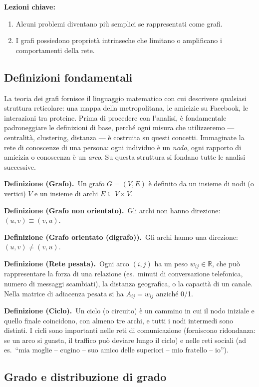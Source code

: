 \documentclass[12pt,a4paper]{article}
\newcommand{\definition}[2]{%
  \vspace{4pt}%
  \noindent\textbf{Definizione (#1).}\ #2\par\vspace{4pt}%
}
\begin{document}
\medskip
\noindent\textbf{Lezioni chiave:}
\begin{enumerate}
  \item Alcuni problemi diventano più semplici se rappresentati come grafi.
  \item I grafi possiedono proprietà intrinseche che limitano o amplificano i comportamenti
        della rete.
\end{enumerate}

\subsection{Definizioni fondamentali}

La teoria dei grafi fornisce il linguaggio matematico con cui descrivere qualsiasi struttura
reticolare: una mappa della metropolitana, le amicizie su Facebook, le interazioni tra proteine.
Prima di procedere con l'analisi, è fondamentale padroneggiare le definizioni di base, perché
ogni misura che utilizzeremo — centralità, clustering, distanza — è costruita su questi concetti.
Immaginate la rete di conoscenze di una persona: ogni individuo è un \emph{nodo}, ogni rapporto
di amicizia o conoscenza è un \emph{arco}. Su questa struttura si fondano tutte le analisi
successive.

\definition{Grafo}{Un grafo $G=(V,E)$ è definito da un insieme di nodi (o vertici) $V$ e
un insieme di archi $E \subseteq V \times V$.}

\definition{Grafo non orientato}{Gli archi non hanno direzione: $(u,v) \equiv (v,u)$.}

\definition{Grafo orientato (digrafo)}{Gli archi hanno una direzione: $(u,v) \neq (v,u)$.}

\definition{Rete pesata}{Ogni arco $(i,j)$ ha un peso $w_{ij} \in \mathbb{R}$, che
può rappresentare la forza di una relazione (es.\ minuti di conversazione telefonica,
numero di messaggi scambiati), la distanza geografica, o la capacità di un canale.
Nella matrice di adiacenza pesata si ha $A_{ij} = w_{ij}$ anziché 0/1.}

\definition{Ciclo}{Un ciclo (o circuito) è un cammino in cui il nodo iniziale e quello
finale coincidono, con almeno tre archi, e tutti i nodi intermedi sono distinti.
I cicli sono importanti nelle reti di comunicazione (forniscono ridondanza: se un
arco si guasta, il traffico può deviare lungo il ciclo) e nelle reti sociali (ad es.\
``mia moglie -- cugino -- suo amico delle superiori -- mio fratello -- io'').}

\subsection{Grado e distribuzione di grado}
\end{document}
